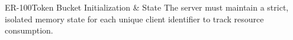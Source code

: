 \begin{equipmentrequirement}{ER-100}{Token Bucket Initialization \& State}
    The server must maintain a strict, isolated memory state for each unique client identifier to track resource consumption.
    \safety
    \security
\end{equipmentrequirement}